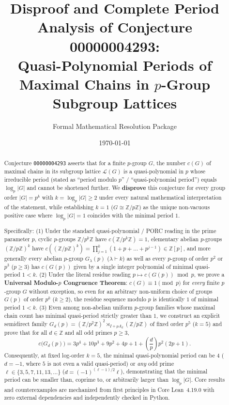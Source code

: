 \documentclass[11pt,a4paper]{article}
\title{\textbf{Disproof and Complete Period Analysis of Conjecture 00000004293:\\
Quasi-Polynomial Periods of Maximal Chains in $p$-Group Subgroup Lattices}}
\author{Formal Mathematical Resolution Package}
\date{\today}
\theoremstyle{definition}
\newcommand{\Leg}[2]{\left(\frac{#1}{#2}\right)}
\begin{document}
\maketitle

\begin{abstract}
Conjecture \texttt{00000004293} asserts that for a finite $p$-group $G$, the number $c(G)$ of maximal chains in its subgroup lattice $\mathcal{L}(G)$ is a quasi-polynomial in $p$ whose irreducible period (stated as ``period modulo $p$'' / ``quasi-polynomial period'') equals $\log_p |G|$ and cannot be shortened further. We \textbf{disprove} this conjecture for every group order $|G| = p^k$ with $k = \log_p |G| \ge 2$ under every natural mathematical interpretation of the statement, while establishing $k = 1$ ($G \cong \mathbb{Z}/p\mathbb{Z}$) as the unique non-vacuous positive case where $\log_p |G| = 1$ coincides with the minimal period $1$.

Specifically:
(1) Under the standard quasi-polynomial / PORC reading in the prime parameter $p$, cyclic $p$-groups $\mathbb{Z}/p^k\mathbb{Z}$ have $c(\mathbb{Z}/p^k\mathbb{Z}) = 1$, elementary abelian $p$-groups $(\mathbb{Z}/p\mathbb{Z})^k$ have $c((\mathbb{Z}/p\mathbb{Z})^k) = \prod_{j=1}^k (1 + p + \dots + p^{j-1}) \in \mathbb{Z}[p]$, and more generally every abelian $p$-group $G_\lambda(p)$ ($\lambda \vdash k$) as well as every $p$-group of order $p^2$ or $p^3$ ($p \ge 3$) has $c(G(p))$ given by a single integer polynomial of minimal quasi-period $1 < k$.
(2) Under the literal residue reading $p \mapsto c(G(p)) \bmod p$, we prove a \textbf{Universal Modulo-$p$ Congruence Theorem}: $c(G) \equiv 1 \pmod p$ for \emph{every} finite $p$-group $G$ without exception, so even for an arbitrary non-uniform choice of groups $G(p)$ of order $p^k$ ($k \ge 2$), the residue sequence modulo $p$ is identically $1$ of minimal period $1 < k$.
(3) Even among non-abelian uniform $p$-group families whose maximal chain count has minimal quasi-period strictly greater than $1$, we construct an explicit semidirect family $G_d(p) = (\mathbb{Z}/p^2\mathbb{Z})^2 \rtimes_{I + p A_d} (\mathbb{Z}/p\mathbb{Z})$ of fixed order $p^5$ ($k = 5$) and prove that for all $d \in \mathbb{Z}$ and all odd primes $p \ge 3$,
\[
  c\bigl(G_d(p)\bigr) = 3p^4 + 10p^3 + 9p^2 + 4p + 1 + \Leg{d}{p} p^2(2p + 1).
\]
Consequently, at fixed log-order $k = 5$, the minimal quasi-polynomial period can be $4$ ($d = -1$, where $5$ is not even a valid quasi-period) or \emph{any} odd prime $\ell \in \{3, 5, 7, 11, 13, \dots\}$ ($d = (-1)^{(\ell-1)/2}\ell$), demonstrating that the minimal period can be smaller than, coprime to, or arbitrarily larger than $\log_p |G|$. Core results and counterexamples are mechanized from first principles in Core Lean~4.19.0 with zero external dependencies and independently checked in Python.
\end{abstract}
\end{document}

